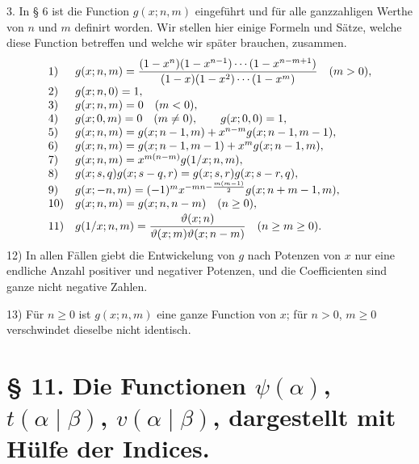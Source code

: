 \documentclass[11pt,a4paper]{article}
\begin{document}
3. In § 6 ist die Function $g(x;n,m)$ eingeführt und für alle ganzzahligen Werthe von $n$ und $m$ definirt worden. Wir stellen hier einige Formeln und Sätze, welche diese Function betreffen und welche wir später brauchen, zusammen.
\[
\begin{array}{ll}
1)&\displaystyle g(x;n,m)={ (1-x^n)(1-x^{n-1})\cdots(1-x^{n-m+1})\over(1-x)(1-x^2)\cdots(1-x^m)}\quad(m>0),\\[1.0ex]
2)&g(x;n,0)=1,\\
3)&g(x;n,m)=0\quad(m<0),\\
4)&g(x;0,m)=0\quad(m\ne0),\qquad g(x;0,0)=1,\\
5)&g(x;n,m)=g(x;n-1,m)+x^{n-m}g(x;n-1,m-1),\\
6)&g(x;n,m)=g(x;n-1,m-1)+x^m g(x;n-1,m),\\
7)&g(x;n,m)=x^{m(n-m)}g(1/x;n,m),\\
8)&g(x;s,q)g(x;s-q,r)=g(x;s,r)g(x;s-r,q),\\
9)&g(x;-n,m)=(-1)^m x^{-mn-{m(m-1)\over2}}g(x;n+m-1,m),\\
10)&g(x;n,m)=g(x;n,n-m)\quad(n\ge0),\\[0.5ex]
11)&\displaystyle g(1/x;n,m)={\vartheta(x;n)\over\vartheta(x;m)\vartheta(x;n-m)}\quad(n\ge m\ge0).
\end{array}
\]
12) In allen Fällen giebt die Entwickelung von $g$ nach Potenzen von $x$ nur eine endliche Anzahl positiver und negativer Potenzen, und die Coefficienten sind ganze nicht negative Zahlen.

13) Für $n\ge0$ ist $g(x;n,m)$ eine ganze Function von $x$; für $n>0$, $m\ge0$ verschwindet dieselbe nicht identisch.

\section*{§ 11. Die Functionen $\psi(\alpha)$, $t(\alpha\mid\beta)$, $v(\alpha\mid\beta)$, dargestellt mit Hülfe der Indices.}
\end{document}
